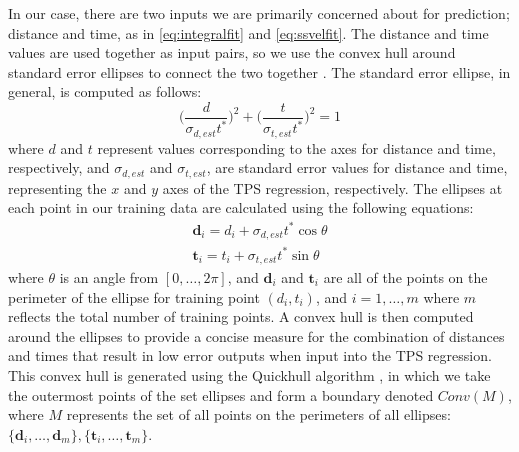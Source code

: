 \documentclass[letterpaper, 10 pt, conference]{ieeeconf}  %
\newcommand\NB[1]{$\spadesuit$\footnote{NB: #1}}
\begin{document}
In our case, there are two inputs we are primarily concerned about for prediction; distance and time, as in \eqref{eq:integralfit} and \eqref{eq:ssvelfit}. The distance and time values are used together as input pairs, so we use the convex hull around standard error ellipses to connect the two together \cite{stdellipse}. The standard error ellipse, in general, is computed as follows: %
\begin{equation}
    \bigg(\frac{d}{\sigma_{d,est}t^*}\bigg)^2 + \bigg(\frac{t}{\sigma_{t,est}t^*}\bigg)^2 = 1
\end{equation}
where $d$ and $t$ represent values corresponding to the axes for distance and time, respectively, and $\sigma_{d,est}$ and $\sigma_{t,est}$, are standard error values for distance and time, representing the $x$ and $y$ axes of the TPS regression, respectively. The ellipses at each point in our training data are calculated using the following equations:
\begin{align} \label{eq:bounds}
    \bm{d}_i = d_i + \sigma_{d,est}t^*\cos{\theta} \nonumber \\
    \bm{t}_i = t_i + \sigma_{t,est}t^*\sin{\theta} 
\end{align}
where $\theta$ is an angle from $[0,\ldots,2\pi]$, and $\bm{d}_i$ and $\bm{t}_i$ are all of the points on the perimeter of the ellipse for training point $(d_i,t_i)$, and $i = 1,\ldots,m$ where $m$ reflects the total number of training points. A convex hull is then computed around the ellipses to provide a concise measure for the combination of distances and times that result in low error outputs when input into the TPS regression. This convex hull is generated using the Quickhull algorithm \cite{quickhull}, in which we take the outermost points of the set ellipses and form a boundary denoted $Conv(M)$, where $M$ represents the set of all points on the perimeters of all ellipses: $\{\bm{d}_i,\ldots,\bm{d}_m\},\{\bm{t}_i,\ldots,\bm{t}_m\}$.
\end{document}

